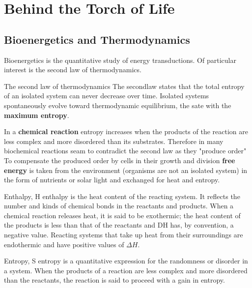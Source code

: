 \documentclass[../main.tex]{subfiles}
\begin{document}
\section{Behind the Torch of Life}
\subsection{Bioenergetics and Thermodynamics}
Bioenergetics is the quantitative study of energy 
transductions. Of particular interest is the second law of thermodynamics.
\begin{DefWithTitle}{The second law of thermodynamics}
	The \gls{secondlaw} states that the total entropy of an isolated system can never decrease over time. Isolated systems spontaneously evolve toward thermodynamic equilibrium, the sate with the \textbf{maximum entropy}.
\end{DefWithTitle}
In a \textbf{chemical reaction} entropy increases when the products of the reaction are less complex and more disordered than its substrates. Therefore in many biochemical reactions seam to contradict the second law as they "produce order"\\
To compensate the produced order by cells in their growth and division \textbf{free energy} is taken from the environment (organisms are not an isolated system) in the form of nutrients or solar light and exchanged for heat and entropy.

\begin{DefWithTitle}{Enthalpy, H}
	\gls{enthalpy} is the heat content of the reacting 
	system. It reflects the number and kinds of chemical bonds in the reactants and products. When a chemical reaction releases heat, it is said to be exothermic; the heat content of the products is less than that of the reactants and DH has, by convention, a negative value. Reacting systems that take up heat from their surroundings are endothermic and have positive values of $\Delta H$.
\end{DefWithTitle}

\begin{DefWithTitle}{Entropy, S}
	\gls{entropy} is a quantitative expression for the randomness or disorder in a system. When the products of a reaction are less complex and more disordered than the reactants, the reaction is said to proceed with a gain in entropy.
\end{DefWithTitle}
\end{document}
